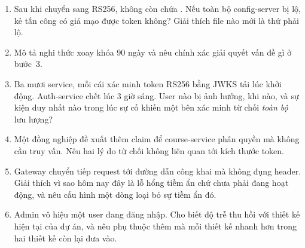 \begin{quiz}
\begin{enumerate}
  \item Sau khi chuyển sang RS256,  không còn
  chứa . Nếu toàn bộ config-server bị lộ, kẻ tấn
  công có giả mạo được token không? Giải thích file nào mới là thứ phải
  lộ.
  \item Mô tả nghi thức xoay khóa 90 ngày và nêu chính xác 
  giải quyết vấn đề gì ở bước~3.
  \item Ba mươi service, mỗi cái xác minh token RS256 bằng JWKS tải lúc
  khởi động. Auth-service chết lúc 3 giờ sáng. User nào bị ảnh hưởng,
  khi nào, và sự kiện duy nhất nào trong lúc sự cố khiến một bên xác
  minh từ chối \emph{toàn bộ} lưu lượng?
  \item Một đồng nghiệp đề xuất thêm claim  để
  course-service phân quyền mà không cần truy vấn. Nêu hai lý do từ
  chối không liên quan tới kích thước token.
  \item Gateway chuyển tiếp request tới đường dẫn công khai mà không
  đụng header. Giải thích vì sao hôm nay đây là lỗ hổng tiềm ẩn chứ chưa
  phải đang hoạt động, và nêu cấu hình một dòng loại bỏ sự tiềm ẩn đó.
  \item Admin vô hiệu một user đang đăng nhập. Cho biết độ trễ thu hồi
  với thiết kế hiện tại của dự án, và nêu phụ thuộc thêm mà mỗi thiết
  kế nhanh hơn trong hai thiết kế còn lại đưa vào.
\end{enumerate}
\end{quiz}
